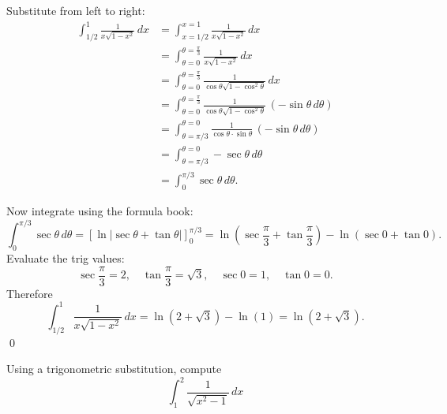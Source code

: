 \begin{solution}
    Substitute from left to right:
    \begin{align*}
        \int_{1/2}^{1}\frac{1}{x\sqrt{1-x^2}}\,dx &=\int_{x=1/2}^{x=1}\frac{1}{x\sqrt{1-x^2}}\,dx \\
        &=\int_{\theta=0}^{\theta=\frac{\pi}{3}}\frac{1}{x\sqrt{1-x^2}}\,dx \\
        &=\int_{\theta=0}^{\theta=\frac{\pi}{3}}\frac{1}{\cos\theta\sqrt{1-\cos^2\theta}}\,dx \\
        &=\int_{\theta=0}^{\theta=\frac{\pi}{3}}\frac{1}{\cos\theta\sqrt{1-\cos^2\theta}}\,(-\sin\theta\,d\theta) \\
        &= \int_{\theta=\pi/3}^{\theta=0}\frac{1}{\cos\theta\cdot \sin\theta}\,(-\sin\theta\,d\theta)\\
        &= \int_{\theta=\pi/3}^{\theta=0} -\sec\theta\,d\theta\\
        &= \int_{0}^{\pi/3}\sec\theta\,d\theta.
    \end{align*}

    Now integrate using the formula book:
    \[
        \int_{0}^{\pi/3}\sec\theta\,d\theta
        = \left[\ln\left|\sec\theta+\tan\theta \right|\right]_{0}^{\pi/3}
        = \ln\!\left(\sec\frac{\pi}{3}+\tan\frac{\pi}{3}\right)-\ln(\sec 0+\tan 0).
    \]
    Evaluate the trig values:
    \[
        \sec\frac{\pi}{3}=2,\quad \tan\frac{\pi}{3}=\sqrt{3},\quad \sec 0 = 1,\quad \tan 0=0.
    \]
    Therefore
    \[
        \int_{1/2}^{1}\frac{1}{x\sqrt{1-x^2}}\,dx
        = \ln(2+\sqrt{3}) - \ln(1)
        = \ln(2+\sqrt{3}).
    \]
    \qed
\end{solution}

\begin{example}
    Using a trigonometric substitution, compute
    \[
        \int_{1}^{2}\frac{1}{\sqrt{x^2-1}}\,dx
    \]
\end{example}


